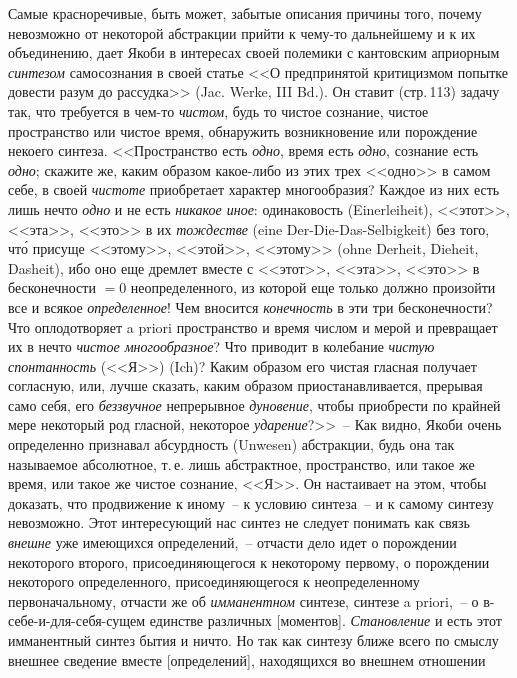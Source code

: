 Самые красноречивые, быть может, забытые описания
причины того, почему невозможно от некоторой абстракции
прийти к чему-то дальнейшему и к их объединению,
дает Якоби в интересах своей полемики с кантовским априорным
\emph{синтезом} самосознания в своей статье <<О предпринятой
критицизмом попытке довести разум до рассудка>>
(Jac. Werke, III Bd.). Он ставит (стр.\,113) задачу
так, что требуется в чем-то \emph{чистом}, будь то чистое сознание,
чистое пространство или чистое время, обнаружить
возникновение или порождение некоего синтеза. <<Пространство
есть \emph{одно}, время есть \emph{одно}, сознание есть \emph{одно};
скажите же, каким образом какое-либо из этих трех
<<одно>> в самом себе, в своей \emph{чистоте} приобретает характер
многообразия? Каждое из них есть лишь нечто \emph{одно}
и не есть \emph{никакое иное}: одинаковость (Einerleiheit),
<<этот>>, <<эта>>, <<это>> в их \emph{тождестве} (eine Der-Die-Das-Selbigkeit)
без того, чт\'о присуще <<этому>>, <<этой>>, <<этому>>
(ohne Derheit, Dieheit, Dasheit), ибо оно еще дремлет
вместе с <<этот>>, <<эта>>, <<это>> в бесконечности $= 0$ неопределенного,
из которой еще только должно произойти
все и всякое \emph{определенное}! Чем вносится \emph{конечность} в
эти три бесконечности? Что оплодотворяет a priori пространство
и время числом и мерой и превращает их в
нечто \emph{чистое многообразное}? Что приводит в колебание
\emph{чистую спонтанность} (<<Я>>) (Ich)? Каким образом его
чистая гласная получает согласную, или, лучше сказать,
каким образом приостанавливается, прерывая само себя,
его \emph{беззвучное} непрерывное \emph{дуновение}, чтобы приобрести
по крайней мере некоторый род гласной, некоторое
\emph{ударение}?>>~-- Как видно, Якоби очень определенно признавал
абсурдность (Unwesen) абстракции, будь она так
называемое абсолютное, т.\,е. лишь абстрактное, пространство,
или такое же время, или такое же чистое сознание,
<<Я>>. Он настаивает на этом, чтобы доказать, что
продвижение к иному~-- к условию синтеза~-- и к самому
синтезу невозможно. Этот интересующий нас синтез не
следует понимать как связь \emph{внешне} уже имеющихся определений,~--
отчасти дело идет о порождении некоторого
второго, присоединяющегося к некоторому первому, о
порождении некоторого определенного, присоединяющегося
к неопределенному первоначальному, отчасти же об
\emph{имманентном} синтезе, синтезе a priori,~-- о в-себе-и-для-себя-сущем
единстве различных [моментов]. \emph{Становление}
и есть этот имманентный синтез бытия и ничто. Но так
как синтезу ближе всего по смыслу внешнее сведение
вместе [определений], находящихся во внешнем отношении
